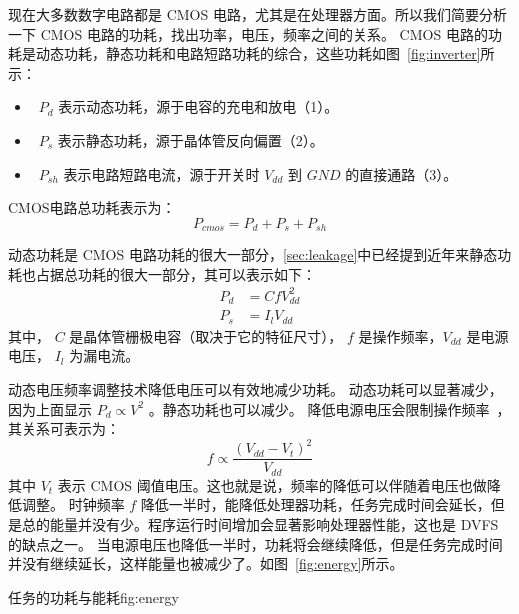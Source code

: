 现在大多数数字电路都是 CMOS 电路，尤其是在处理器方面。所以我们简要分析一下 CMOS 电路的功耗，找出功率，电压，频率之间的关系。
CMOS 电路的功耗是动态功耗，静态功耗和电路短路功耗的综合，这些功耗如图~\ref{fig:inverter}所示：
\begin{itemize}
\item  ~$P_d$ 表示动态功耗，源于电容的充电和放电（1）。
\item  ~$P_s$ 表示静态功耗，源于晶体管反向偏置（2）。
\item  ~$P_{sh}$ 表示电路短路电流，源于开关时 $V_{dd}$ 到 $GND$ 的直接通路（3）。
\end{itemize}
CMOS电路总功耗表示为：
\begin{equation}\label{eq:cmos}
P_{cmos} = P_d + P_s + P_{sh} 
\end{equation}


动态功耗是 CMOS 电路功耗的很大一部分，\ref{sec:leakage}中已经提到近年来静态功耗也占据总功耗的很大一部分，其可以表示如下：
\begin{equation}\label{eq:DVFS}
\begin{split}
P_d &= CfV_{dd}^2 \\
P_s &= I_lV_{dd}  
\end{split}
\end{equation}
其中，  $C$ 是晶体管栅极电容（取决于它的特征尺寸），
$f$ 是操作频率，$V_{dd}$ 是电源电压， $I_l$ 为漏电流。

动态电压频率调整技术降低电压可以有效地减少功耗。
动态功耗可以显著减少，因为上面显示 $P_d \propto V^2$ 。静态功耗也可以减少。
 降低电源电压会限制操作频率~\cite{suleiman2005dynamic}，其关系可表示为：
 \begin{equation}\label{eq:fv}
 f \propto \frac{(V_{dd} - V_t)^2}{V_{dd}} 
 \end{equation}
 其中 $V_t$ 表示 CMOS 阈值电压。这也就是说，频率的降低可以伴随着电压也做降低调整。
 时钟频率 $f$ 降低一半时，能降低处理器功耗，任务完成时间会延长，但是总的能量并没有少。程序运行时间增加会显著影响处理器性能，这也是 DVFS 的缺点之一。
 当电源电压也降低一半时，功耗将会继续降低，但是任务完成时间并没有继续延长，这样能量也被减少了。如图~\ref{fig:energy}所示。
 
\begin{pics}{任务的功耗与能耗}{fig:energy}
\end{pics}


